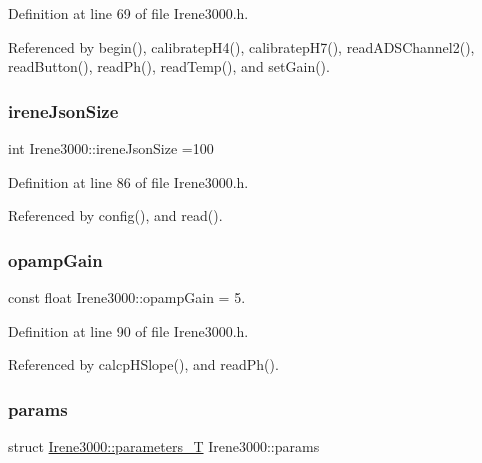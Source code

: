 Definition at line 69 of file Irene3000.\+h.



Referenced by begin(), calibratep\+H4(), calibratep\+H7(), read\+A\+D\+S\+Channel2(), read\+Button(), read\+Ph(), read\+Temp(), and set\+Gain().

\mbox{\label{classIrene3000_a6534710e4c81669dcc828d2c5450fabe}} 
\subsubsection{\texorpdfstring{irene\+Json\+Size}{ireneJsonSize}}
{\footnotesize\ttfamily int Irene3000\+::irene\+Json\+Size =100\hspace{0.3cm}{\ttfamily [private]}}



Definition at line 86 of file Irene3000.\+h.



Referenced by config(), and read().

\mbox{\label{classIrene3000_a4e588985ca74e5076029d5dee81034f2}} 
\subsubsection{\texorpdfstring{opamp\+Gain}{opampGain}}
{\footnotesize\ttfamily const float Irene3000\+::opamp\+Gain = 5.\hspace{0.3cm}{\ttfamily [private]}}



Definition at line 90 of file Irene3000.\+h.



Referenced by calcp\+H\+Slope(), and read\+Ph().

\mbox{\label{classIrene3000_a136585a5ee7f9ac6ab52175fa153f8e3}} 
\subsubsection{\texorpdfstring{params}{params}}
{\footnotesize\ttfamily struct \hyperlink{structIrene3000_1_1parameters__T}{Irene3000\+::parameters\+\_\+T} Irene3000\+::params\hspace{0.3cm}{\ttfamily [private]}}



